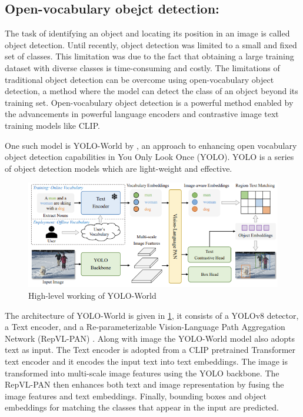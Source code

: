 \subsection{Open-vocabulary obejct detection:}
The task of identifying an object and locating its position in an image is called object detection. Until recently, object detection was limited to a small and fixed
set of classes. This limitation was due to the fact that obtaining a large training dataset with diverse classes is time-consuming and costly. \cite{10.1007/978-3-031-20080-9_42} 
The limitations of traditional object detection can be overcome using open-vocabulary object detection, a method where the model can detect the class of an 
object beyond its training set. Open-vocabulary object detection is a powerful method enabled by the advancements in powerful language encoders 
and contrastive image text training models like CLIP. 

One such model is YOLO-World by \citet{cheng2024yolow}, an approach to enhancing open vocabulary object detection capabilities in You Only Look Once (YOLO).
YOLO is a series of object detection models which are light-weight and effective. 
\begin{figure}[ht!]
    \centering
    \includegraphics[width=\textwidth]{content/images/YOLOWorld.png}
    \caption{High-level working of YOLO-World \cite{cheng2024yolow}}
    \label{fig:yolo}
\end{figure}

The architecture of YOLO-World is given in \cref{fig:yolo}, it consists of a YOLOv8 detector, a Text encoder, and a Re-parameterizable Vision-Language
Path Aggregation Network (RepVL-PAN) \cite{cheng2024yolow}. Along with image the YOLO-World model also adopts text as input. The Text encoder is adopted
from a CLIP pretrained Transformer text encoder and it encodes the input text into text embeddings. The image is transformed into multi-scale image features using the 
YOLO backbone. The RepVL-PAN then enhances both text and image representation by fusing the image features and text embeddings. Finally, bounding boxes and object 
embeddings for matching the classes that appear in the input are predicted.

